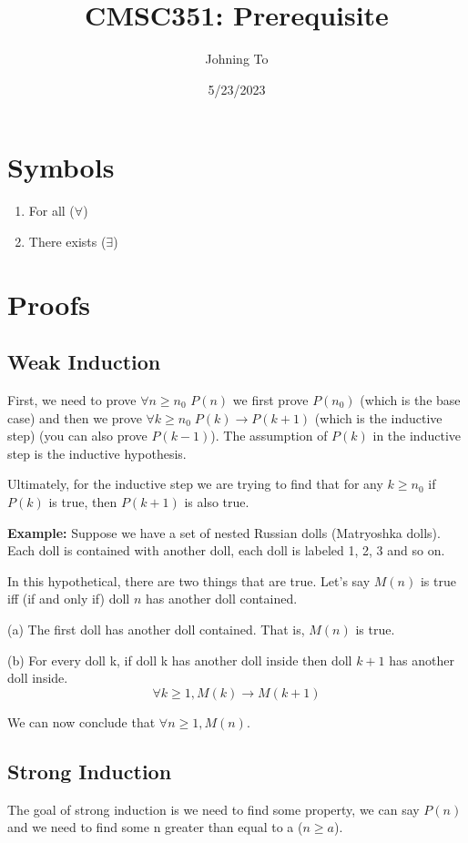 \documentclass{article}
\title{CMSC351: Prerequisite}
\author{Johning To}
\date{5/23/2023}
\begin{document}
\maketitle

\tableofcontents
\clearpage

\section{Symbols}
\begin{enumerate}
  \item For all ($ \forall $)
  \item There exists ($ \exists $)
\end{enumerate}

\clearpage

\section{Proofs}
\subsection {Weak Induction}
First, we need to prove $ \forall n \ge n_0 $ $ P(n) $ we first prove $ P(n_0) $ (which is the base case) and
then we prove $ \forall k \ge n_0 \; P(k) \rightarrow P(k+1) $ (which is the inductive step) (you can also prove $ P(k - 1) $).
The assumption of $ P(k) $ in the inductive step is the inductive hypothesis.

Ultimately, for the inductive step we are trying to find that for any $ k \ge n_0 $ if $ P(k) $ is true, then $ P(k + 1) $ is also true. 

\textbf{Example:}
Suppose we have a set of nested Russian dolls (Matryoshka dolls). Each doll is contained with another doll, each doll is labeled 1, 2, 3 and so on. 

In this hypothetical, there are two things that are true. Let's say $ M(n) $ is true iff (if and only if) doll $ n $ has another doll contained.

(a) The first doll has another doll contained. That is, $ M(n) $ is true.

(b) For every doll k, if doll k has another doll inside then doll $ k + 1 $ has another doll inside.
$$ \forall k \ge 1, M(k) \rightarrow M(k + 1) $$

We can now conclude that $ \forall n \ge 1, M(n) $.

\subsection {Strong Induction}
The goal of strong induction is we need to find some property, we can say $ P(n) $ and 
we need to find some n greater than equal to a ($ n \ge a $).
\end{document}
